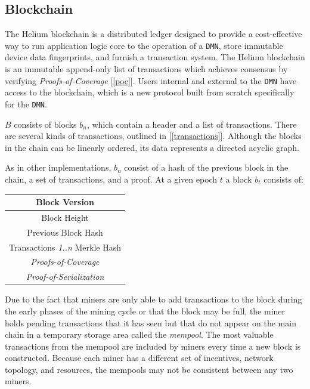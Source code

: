 \documentclass[UTF8, 10pt, nonatbib, nocopyrightspace, reprint]{sigplanconf}
\newcommand{\secref}[1]{[\autoref{#1}]}
\begin{document}
\subsection{Blockchain} \label{blockchain}

The Helium blockchain is a distributed ledger designed to provide a cost-effective way to run application logic core to the operation of a \verb|DMN|, store immutable device data fingerprints, and furnish a transaction system. The Helium blockchain is an immutable append-only list of transactions which achieves consensus by verifying \emph{Proofs-of-Coverage} \secref{poc}. Users internal and external to the \verb|DMN| have access to the blockchain, which is a new protocol built from scratch specifically for the \verb|DMN|.

$B$ consists of blocks $b_n$, which contain a header and a list of transactions. There are several kinds of transactions, outlined in \secref{transactions}. Although the blocks in the chain can be linearly ordered, its data represents a directed acyclic graph.

As in other implementations, $b_n$ consist of a hash of the previous block in the chain, a set of transactions, and a proof. At a given epoch $t$ a block $b_t$ consists of:

\begin{center}
    \begin{tabular}{|c|}
         \hline
         Block Version \\
         \hline
         Block Height \\
         \hline
         Previous Block Hash \\
         \hline
         Transactions \emph{1..n} Merkle Hash \\
         \hline
         \emph{Proofs-of-Coverage} \\
         \hline
         \emph{Proof-of-Serialization} \\
         \hline
    \end{tabular}
\end{center}

Due to the fact that miners are only able to add transactions to the block during the early phases of the mining cycle or that the block may be full, the miner holds pending transactions that it has seen but that do not appear on the main chain in a temporary storage area called the \emph{mempool}. The most valuable transactions from the mempool are included by miners every time a new block is constructed. Because each miner has a different set of incentives, network topology, and resources, the mempools may not be consistent between any two miners.
\end{document}
